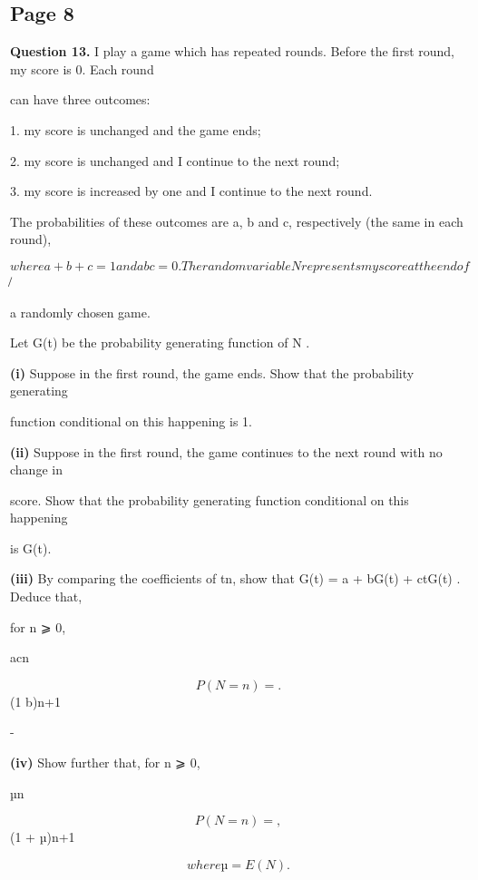 \documentclass[12pt]{article}
\begin{document}
\subsection*{Page 8}
\begin{flushleft}
\bigskip\textbf{Question 13.} I play a game which has repeated rounds. Before the first round, my score is 0. Each round\par
can have three outcomes:\par
1. my score is unchanged and the game ends;\par
2. my score is unchanged and I continue to the next round;\par
3. my score is increased by one and I continue to the next round.\par
The probabilities of these outcomes are a, b and c, respectively (the same in each round),\par
\[where a + b + c = 1 and abc = 0. The random variable N represents my score at the end of\]
̸\par
a randomly chosen game.\par
Let G(t) be the probability generating function of N .\par
\textbf{(i)} Suppose in the first round, the game ends. Show that the probability generating\par
function conditional on this happening is 1.\par
\textbf{(ii)} Suppose in the first round, the game continues to the next round with no change in\par
score. Show that the probability generating function conditional on this happening\par
is G(t).\par
\textbf{(iii)} By comparing the coefficients of tn, show that G(t) = a + bG(t) + ctG(t) . Deduce that,\par
for n ⩾ 0,\par
acn\par
\[P (N = n) = .\]
(1 b)n+1\par
-\par
\textbf{(iv)} Show further that, for n ⩾ 0,\par
µn\par
\[P (N = n) = ,\]
(1 + µ)n+1\par
\[where µ = E(N ).\]
\end{flushleft}
\end{document}
